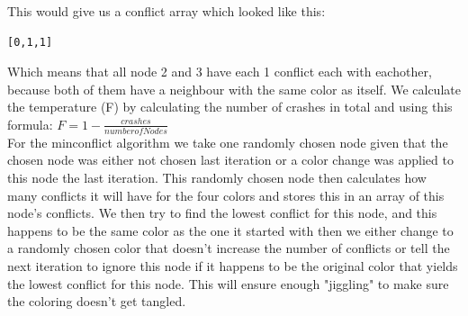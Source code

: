 \documentclass[12pt, a4paper]{article}
\begin{document}
This would give us a conflict array which looked like this:\\
\begin{center}
\begin{verbatim}
[0,1,1]
\end{verbatim}
\end{center}
Which means that all node 2 and 3 have each 1 conflict each with eachother, because both of them have a neighbour with the same color as itself. We calculate the temperature (F) by calculating the number of crashes in total and using this formula: $F = 1- \frac{crashes}{number of Nodes}$ \\
For the minconflict algorithm we take one randomly chosen node given that the chosen node was either not chosen last iteration or a color change was applied to this node the last iteration. This randomly chosen node then calculates how many conflicts it will have for the four colors and stores this in an array of this node's conflicts. We then try to find the lowest conflict for this node, and this happens to be the same color as the one it started with then we either change to a randomly chosen color that doesn't increase the number of conflicts or tell the next iteration to ignore this node if it happens to be the original color that yields the lowest conflict for this node. This will ensure enough "jiggling" to make sure the coloring doesn't get tangled. 
\end{document}
